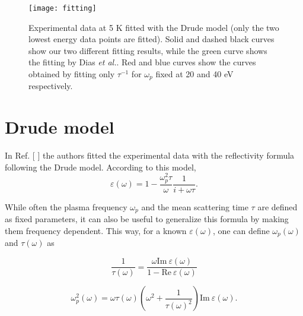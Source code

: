 \documentclass[11pt,titlepage,a4paper,twoside]{article}
\newcommand{\onlinecite}[1]{\hspace{-1 ex} \nocite{#1}\citenum{#1}}
\begin{document}
\begin{figure}[t]
 \texttt{[image: fitting]}\hspace{0.1cm}
 \caption{\label{fitting} Experimental data at 5 K \cite{Diaseaal1579} fitted with the Drude model (only the two lowest energy data points are fitted). Solid and dashed black curves show our two different fitting results, while the green curve shows the fitting by
 Dias \textit{et al.}\cite{Dias2017}. Red and blue curves show the curves obtained by fitting only $\tau^{-1}$ for $\omega_p$ fixed at 20 and 40 eV respectively. 
}
\end{figure}

\section{Drude model}


In Ref. [\onlinecite{Diaseaal1579}] the authors fitted the experimental data with the reflectivity formula following the Drude model. According to this model,
\begin{equation}
\varepsilon(\omega)=1-  \frac{\omega_p^2 \tau}{\omega}\frac{1}{i+\omega\tau}.
\end{equation}

While often the plasma frequency $\omega_p$ and the mean scattering time $\tau$ are defined as fixed parameters, it can also be useful to generalize this formula by making them frequency dependent. This way, for a known
$\varepsilon(\omega)$, one can define $\omega_p(\omega)$ and $\tau(\omega)$ as

\begin{equation}
 \frac{1}{\tau(\omega)}=\frac{\omega \mathrm{Im}~\varepsilon(\omega)}{1-\mathrm{Re}~\varepsilon(\omega)}
\end{equation}

\begin{equation}
\omega_p^2(\omega)=\omega\tau(\omega)\left(\omega^2+\frac{1}{\tau(\omega)^2}\right)\mathrm{Im}~\varepsilon(\omega).
\end{equation}
\end{document}
